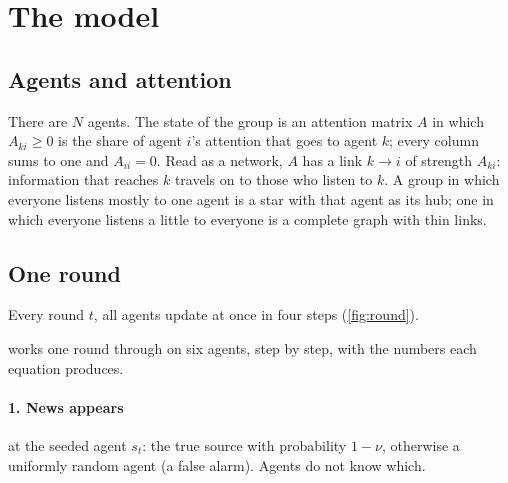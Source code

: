 \section{The model}\label{sec:model}

\subsection{Agents and attention}
There are $N$ agents. The state of the group is an attention matrix $A$ in which $A_{ki}\ge 0$ is the share of agent
$i$'s attention that goes to agent $k$; every column sums to one and $A_{ii}=0$. Read as a network, $A$ has a link
$k\to i$ of strength $A_{ki}$: information that reaches $k$ travels on to those who listen to $k$. A group in which
everyone listens mostly to one agent is a star with that agent as its hub; one in which everyone listens a little to
everyone is a complete graph with thin links.

\subsection{One round}
Every round $t$, all agents update at once in four steps (\cref{fig:round}).


\noindent {} works one round through on six agents, step by step, with the numbers each equation produces.

\paragraph{1. News appears} at the seeded agent $s_t$: the true source with probability $1-\nu$, otherwise a uniformly
random agent (a false alarm). Agents do not know which.

